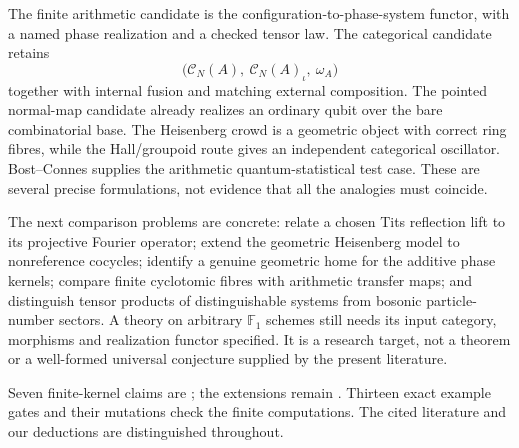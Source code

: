 The finite arithmetic candidate is the configuration-to-phase-system
functor, with a named phase realization and a checked tensor law. The
categorical candidate retains
\[
\bigl(\mathcal C_N(A),\ \mathcal C_N(A)_\iota,\ \omega_A\bigr)
\]
together with internal fusion and matching external composition. The
pointed normal-map candidate already realizes an ordinary qubit over
the bare combinatorial base. The Heisenberg crowd is a geometric object
with correct ring fibres, while the Hall/groupoid route gives an
independent categorical oscillator. Bost--Connes supplies the arithmetic
quantum-statistical test case. These are several precise formulations,
not evidence that all the analogies must coincide.

The next comparison problems are concrete: relate a chosen Tits reflection
lift to its projective Fourier operator; extend the geometric Heisenberg
model to nonreference cocycles; identify a genuine geometric home for the
additive phase kernels; compare finite cyclotomic fibres with arithmetic
transfer maps; and distinguish tensor products of distinguishable systems
from bosonic particle-number sectors. A theory on arbitrary $\mathbb F_1$
schemes still needs its input category, morphisms and realization functor
specified. It is a research target, not a theorem or a well-formed
universal conjecture supplied by the present literature.

Seven finite-kernel claims are \statusProved{}; the extensions remain
\statusSketch{}. Thirteen exact example gates and their mutations check
the finite computations. The cited literature and our deductions are
distinguished throughout.
